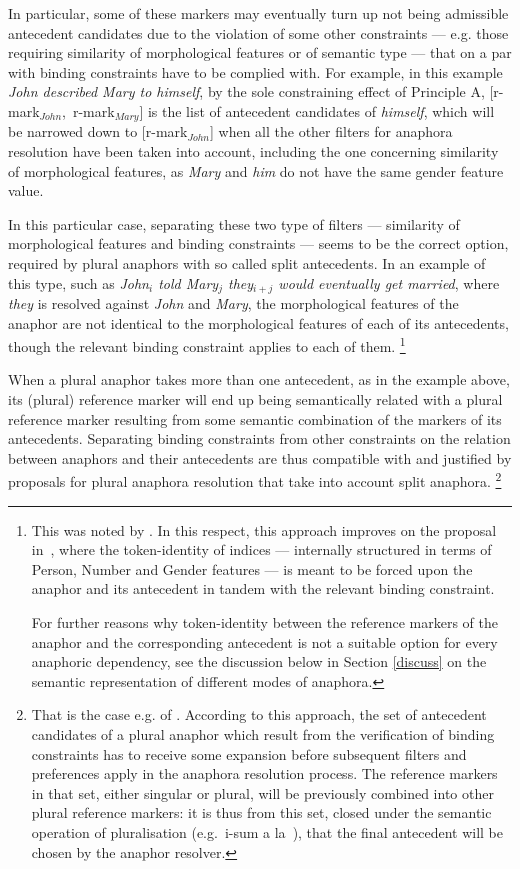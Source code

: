 \documentclass[output=paper
,modfonts
,nonflat]{langsci/langscibook}
\begin{document}
In particular, some of these markers 
may eventually turn up not being admissible antecedent candidates due to the violation of some
other constraints --- e.g. those requiring similarity of morphological features
or of semantic type --- that on a par with binding constraints
have to be complied with. For example, in this example {\it John described Mary to himself}, by the sole
constraining effect of Principle A, \mbox{[r-mark$_{John}$, r-mark$_{Mary}$]} 
is the list of antecedent candidates of
{\it himself}, which will be narrowed down to [r-mark$_{John}$] when all the other
filters for anaphora resolution have been taken into account, including
the one concerning similarity of morphological features,
as {\it Mary} and {\it him} do not have the same gender feature value.

In this particular case, separating these two type of filters --- similarity of
morphological features and binding constraints --- seems to be the correct
option, required by plural anaphors with so called split antecedents. In an example 
of this type, such as {\it John$_{i}$ told Mary$_{j}$ they$_{i+j}$ would eventually get
married}, where {\it they} is resolved against {\it John} and {\it Mary}, the
morphological features of the anaphor are not identical to the morphological
features of each of its antecedents, though the relevant binding constraint
applies to each of them.%
%
\footnote{This was noted by \citep{higg:split83}. In this respect, this approach improves on the proposal in~\citep{polsag:hpsg94},
where the token-identity of indices --- internally structured in
terms of Person, Number and Gender features --- is meant to be
forced upon the anaphor and its antecedent in tandem with the relevant binding
constraint. 

For further reasons why token-identity between
the reference markers of the anaphor and the corresponding antecedent
is not a suitable option for every anaphoric dependency,
see the discussion below in Section \ref{discuss}
on the semantic representation of different modes of anaphora.}
% 


When a plural anaphor takes more than one antecedent, as in the example above, 
its (plural) reference marker will end up being semantically related with a
plural reference marker resulting from some semantic combination
of the markers of its antecedents. Separating binding constraints from
other constraints on the relation between anaphors and their antecedents
are thus compatible with and justified by proposals for plural anaphora 
resolution that take into account split anaphora.%
%
\footnote{
That is the case e.g. of \citep{eschen:plural89}. According to this approach, the set of antecedent candidates of 
a plural anaphor which result from the verification of
binding constraints has to receive some expansion before subsequent 
filters and preferences apply in the anaphora resolution process. The reference
markers in that set, either singular or plural, will be 
previously combined into other plural reference markers: it is thus
from this set, closed under the semantic operation of 
pluralisation (e.g.\ i-sum a la~\citep{link:isums83}),
that the final antecedent will be chosen by the anaphor resolver.
}
\end{document}
